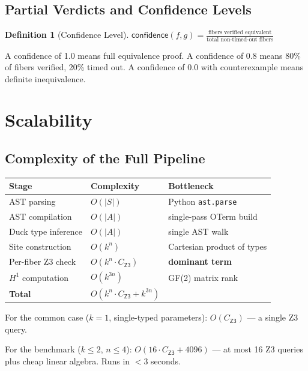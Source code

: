 \documentclass[11pt,a4paper]{report}
\theoremstyle{definition}
\newtheorem{definition}{Definition}[chapter]
\theoremstyle{plain}
\newcommand{\Hone}{H^1}
\begin{document}
\section{Partial Verdicts and Confidence Levels}

\begin{definition}[Confidence Level]
$\mathsf{confidence}(f, g) = \frac{\text{fibers verified equivalent}}
{\text{total non-timed-out fibers}}$

A confidence of 1.0 means full equivalence proof.
A confidence of 0.8 means 80\% of fibers verified, 20\% timed out.
A confidence of 0.0 with counterexample means definite inequivalence.
\end{definition}


\chapter{Scalability}
\label{ch:scalability}

\section{Complexity of the Full Pipeline}

\begin{center}
\begin{tabular}{l l l}
  \textbf{Stage} & \textbf{Complexity} & \textbf{Bottleneck} \\
  \hline
  AST parsing & $O(|S|)$ & Python \texttt{ast.parse} \\
  AST compilation & $O(|A|)$ & single-pass OTerm build \\
  Duck type inference & $O(|A|)$ & single AST walk \\
  Site construction & $O(k^n)$ & Cartesian product of types \\
  Per-fiber Z3 check & $O(k^n \cdot C_\mathsf{Z3})$ &
    \textbf{dominant term} \\
  $\Hone$ computation & $O(k^{3n})$ & GF(2) matrix rank \\
  \hline
  \textbf{Total} & $O(k^n \cdot C_\mathsf{Z3} + k^{3n})$ & \\
\end{tabular}
\end{center}

For the common case ($k = 1$, single-typed parameters):
$O(C_\mathsf{Z3})$ --- a single Z3 query.

For the benchmark ($k \leq 2$, $n \leq 4$):
$O(16 \cdot C_\mathsf{Z3} + 4096)$ --- at most 16 Z3 queries plus
cheap linear algebra.  Runs in $< 3$ seconds.
\end{document}
